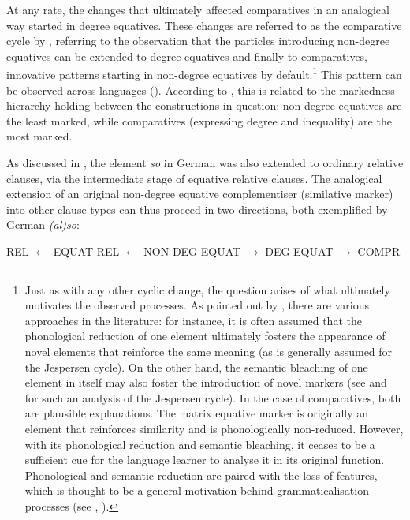 At any rate, the changes that ultimately affected comparatives in an analogical way started in degree equatives. These changes are referred to as the comparative cycle by \citet{jaeger2018}, referring to the observation that the particles introducing non-degree equatives can be extended to degree equatives and finally to comparatives, innovative patterns starting in non-degree equatives by default.\footnote{Just as with any other cyclic change, the question arises of what ultimately motivates the observed processes. As pointed out by \citet[398--400]{jaeger2018}, there are various approaches in the literature: for instance, it is often assumed that the phonological reduction of one element ultimately fosters the appearance of novel elements that reinforce the same meaning (as is generally assumed for the Jespersen cycle). On the other hand, the semantic bleaching of one element in itself may also foster the introduction of novel markers (see \citealt{willislucasbreitbarth2013} and \citealt{chatzopoulou2015} for such an analysis of the Jespersen cycle). In the case of comparatives, both are plausible explanations. The matrix equative marker is originally an element that reinforces similarity and is phonologically non-reduced. However, with its phonological reduction and semantic bleaching, it ceases to be a sufficient cue for the language learner to analyse it in its original function. Phonological and semantic reduction are paired with the loss of features, which is thought to be a general motivation behind grammaticalisation processes (see \citealt{vangelderen2004, vangelderen2008, vangelderen2009, vangelderen2011}, \citealt[428--441]{jaeger2018}).} This pattern can be observed across languages (\citealt[370--397]{jaeger2018}). According to \citet{jaeger2018}, this is related to the markedness hierarchy holding between the constructions in question: non-degree equatives are the least marked, while comparatives (expressing degree and inequality) are the most marked.

As discussed in , the element \textit{so} in German was also extended to ordinary relative clauses, via the intermediate stage of equative relative clauses. The analogical extension of an original non-degree equative complementiser (similative marker) into other clause types can thus proceed in two directions, both exemplified by German \textit{(al)so}:

\ea REL $\leftarrow$ EQUAT-REL $\leftarrow$ NON-DEG EQUAT $\rightarrow$ DEG-EQUAT $\rightarrow$ COMPR \label{schema}
\z

